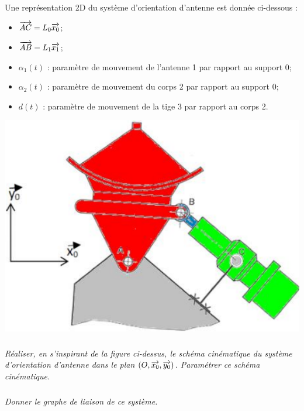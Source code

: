 \documentclass[11pt,oneside]{article}
\begin{document}
\begin{minipage}[c]{.65\linewidth}
Une représentation 2D du système d’orientation d’antenne est donnée ci-dessous :
\begin{itemize}
\item $\overrightarrow{AC}=L_0\overrightarrow{x_0}$;
\item $\overrightarrow{AB}=L_1\overrightarrow{x_1}$;
\item $\alpha_1(t)$ : paramètre de mouvement de l’antenne 1 par rapport au support 0; 
\item $\alpha_2(t)$ : paramètre de mouvement du corps 2 par rapport au support 0;
\item $d(t)$ : paramètre de mouvement de la tige 3 par rapport au corps 2. 
\end{itemize}
\end{minipage} \hfill
\begin{minipage}[c]{.3\linewidth}
\begin{center}
\includegraphics[width=.95\textwidth]{png/fig6} 
\end{center}
\end{minipage} 


\subparagraph{}
\textit{Réaliser, en s’inspirant de la figure ci-dessus, le schéma cinématique du système d’orientation d’antenne dans le plan 
$\left(O,\overrightarrow{x_0},\overrightarrow{y_0}\right)$. Paramétrer ce schéma cinématique. }


\subparagraph{}
\textit{Donner le graphe de liaison de ce système.}

\end{document}
